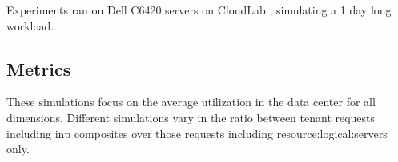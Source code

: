 Experiments ran on Dell C6420 servers on CloudLab \cite{cloudlab}, simulating a 1 day long workload. %

\subsection{Metrics}
These simulations focus on the average  utilization in the data center for all dimensions.
Different simulations vary in the ratio between tenant requests including \gls{inp} composites over those requests including \glspl{resource:logical:server} only.